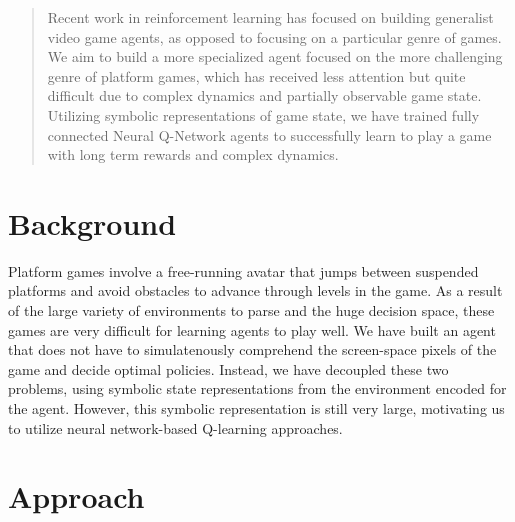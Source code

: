 \documentclass{article}
\begin{document}
 


\begin{abstract} 
Recent work in reinforcement learning has focused on building generalist video game agents, as opposed to focusing on a particular genre of games. We aim to build a more specialized agent focused on the more challenging genre of platform games, which has received less attention but quite difficult due to complex dynamics and partially observable game state. Utilizing symbolic representations of game state, we have trained fully connected Neural Q-Network agents to successfully learn to play a game with long term rewards and complex dynamics.
\end{abstract} 

\section{Background}
Platform games involve a free-running avatar that jumps between suspended platforms and avoid obstacles to advance through levels in the game. As a result of the large variety of environments to parse and the huge decision space, these games are very difficult for learning agents to play well. We have built an agent that does not have to simulatenously comprehend the screen-space pixels of the game and decide optimal policies. Instead, we have decoupled these two problems, using symbolic state representations from the environment encoded for the agent. However, this symbolic representation is still very large, motivating us to utilize neural network-based Q-learning approaches. 

\section{Approach}
\end{document}
